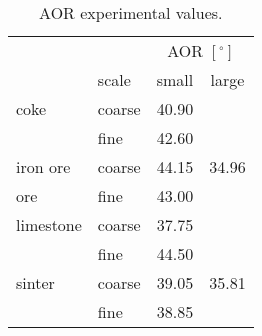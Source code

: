 \begin{table}[h!]
\centering
\begin{tabular}{ll|cc}
\hline
          &       & \multicolumn{2}{c}{AOR $[^\circ]$} \\
            & scale & small & large \\
\hline
    coke  & coarse & 40.90 & \\
      & fine  & 42.60 &  \\
\hline      
    iron ore & coarse & 44.15 & 34.96 \\
     ore & fine  & 43.00 & \\
\hline     
    limestone & coarse & 37.75 & \\
     & fine  & 44.50 & \\
\hline     
    sinter & coarse & 39.05 & 35.81 \\
     & fine  & 38.85 & \\
             \hline
\end{tabular}
\caption{AOR experimental values.}
\label{tab:23aor}
\end{table}